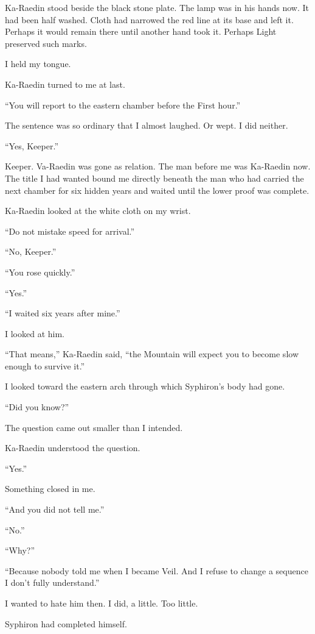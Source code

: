 Ka-Raedin stood beside the black stone plate.
The lamp was in his hands now.
It had been half washed.
Cloth had narrowed the red line at its base and left it.
Perhaps it would remain there until another hand took it.
Perhaps Light preserved such marks.\par
I held my tongue.\par
Ka-Raedin turned to me at last.\par
``You will report to the eastern chamber before the First hour.''\par
The sentence was so ordinary that I almost laughed.
Or wept.
I did neither.\par
``Yes, Keeper.''\par
Keeper.
Va-Raedin was gone as relation.
The man before me was Ka-Raedin now.
The title I had wanted bound me directly beneath the man who had carried the next chamber for six hidden years and waited until the lower proof was complete.\par
Ka-Raedin looked at the white cloth on my wrist.\par
``Do not mistake speed for arrival.''\par
``No, Keeper.''\par
``You rose quickly.''\par
``Yes.''\par
``I waited six years after mine.''\par
I looked at him.\par
``That means,'' Ka-Raedin said, ``the Mountain will expect you to become slow enough to survive it.''\par
I looked toward the eastern arch through which Syphiron's body had gone.\par
``Did you know?''\par
The question came out smaller than I intended.\par
Ka-Raedin understood the question.\par
``Yes.''\par
Something closed in me.\par
``And you did not tell me.''\par
``No.''\par
``Why?''\par
``Because nobody told me when I became Veil. And I refuse to change a sequence I don't fully understand.''\par
I wanted to hate him then.
I did, a little.
Too little.\par
Syphiron had completed himself.
